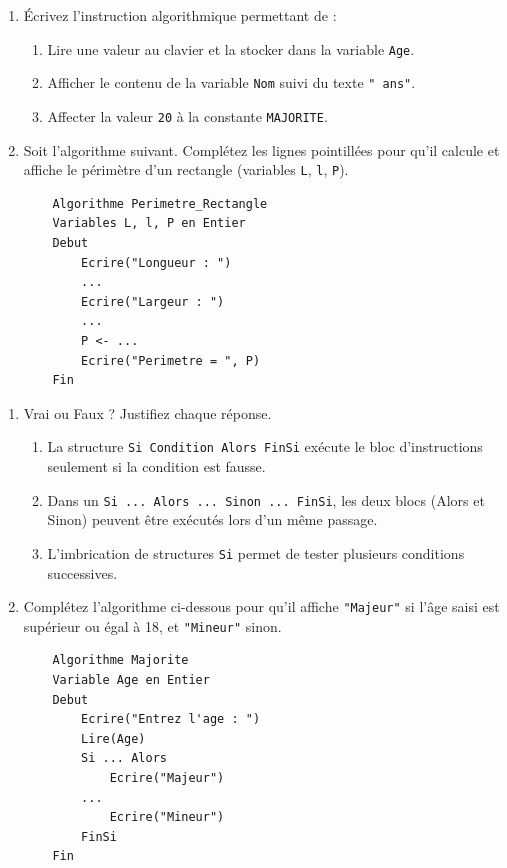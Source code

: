 \documentclass[11pt]{article}
\begin{document}
\begin{exercice}
\begin{enumerate}
    \item Écrivez l'instruction algorithmique permettant de : 
    \begin{enumerate}
        \item Lire une valeur au clavier et la stocker dans la variable \texttt{Age}.
        \item Afficher le contenu de la variable \texttt{Nom} suivi du texte \texttt{" ans"}.
        \item Affecter la valeur \texttt{20} à la constante \texttt{MAJORITE}.
    \end{enumerate}
    \item Soit l'algorithme suivant. Complétez les lignes pointillées pour qu'il calcule et affiche le périmètre d'un rectangle (variables \texttt{L}, \texttt{l}, \texttt{P}).
    \begin{verbatim}
    Algorithme Perimetre_Rectangle
    Variables L, l, P en Entier
    Debut
        Ecrire("Longueur : ")
        ...
        Ecrire("Largeur : ")
        ...
        P <- ...
        Ecrire("Perimetre = ", P)
    Fin
    \end{verbatim}
\end{enumerate}
\end{exercice}

\begin{exercice}
\begin{enumerate}
    \item Vrai ou Faux ? Justifiez chaque réponse.
    \begin{enumerate}
        \item La structure \texttt{Si Condition Alors FinSi} exécute le bloc d'instructions seulement si la condition est fausse.
        \item Dans un \texttt{Si ... Alors ... Sinon ... FinSi}, les deux blocs (Alors et Sinon) peuvent être exécutés lors d'un même passage.
        \item L'imbrication de structures \texttt{Si} permet de tester plusieurs conditions successives.
    \end{enumerate}
    \item Complétez l'algorithme ci-dessous pour qu'il affiche \texttt{"Majeur"} si l'âge saisi est supérieur ou égal à 18, et \texttt{"Mineur"} sinon.
    \begin{verbatim}
    Algorithme Majorite
    Variable Age en Entier
    Debut
        Ecrire("Entrez l'age : ")
        Lire(Age)
        Si ... Alors
            Ecrire("Majeur")
        ...
            Ecrire("Mineur")
        FinSi
    Fin
    \end{verbatim}
\end{enumerate}
\end{exercice}
\end{document}
